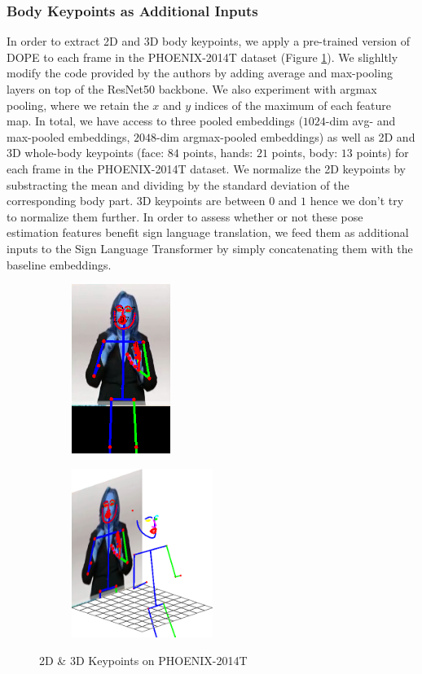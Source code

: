 \documentclass[final]{cvpr}
\begin{document}
\subsubsection{Body Keypoints as Additional Inputs}
In order to extract 2D and 3D body keypoints, we apply a pre-trained version of DOPE \cite{dope} to each frame in the PHOENIX-2014T dataset (Figure \ref{fig:2d_3d}). We slighltly modify the code provided by the authors by adding average and max-pooling layers on top of the ResNet50 backbone. We also experiment with argmax pooling, where we retain the $x$ and $y$ indices of the maximum of each feature map. In total, we have access to three pooled embeddings ($1024$-dim avg- and max-pooled embeddings, $2048$-dim argmax-pooled embeddings) as well as 2D and 3D whole-body keypoints (face: $84$ points, hands: $21$ points, body: $13$ points) for each frame in the PHOENIX-2014T dataset. We normalize the 2D keypoints by substracting the mean and dividing by the standard deviation of the corresponding body part. 3D keypoints are between $0$ and $1$ hence we don't try to normalize them further. In order to assess whether or not these pose estimation features benefit sign language translation, we feed them as additional inputs to the Sign Language Transformer by simply concatenating them with the baseline embeddings.

\begin{figure}[h]
	\begin{subfigure}[h]{0.5\linewidth}
		\centering
			\includegraphics[height=5.5cm]{fig/toy_DOPE_v1_0_0_2d.png}
	\end{subfigure}\hfill
	\begin{subfigure}[]{0.5\linewidth}
		\centering
		\includegraphics[height=5.5cm]{fig/toy_DOPE_v1_0_0_3d_cropped.png}
	\end{subfigure}
	\caption{2D \& 3D Keypoints on PHOENIX-2014T}
	\label{fig:2d_3d}
\end{figure}
\end{document}
